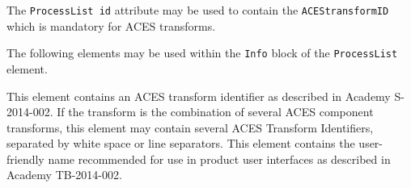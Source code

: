 \label{appendixB}

The \texttt{ProcessList id} attribute may be used to contain the \texttt{ACEStransformID} which is mandatory for ACES transforms.

The following elements may be used within the \texttt{Info} block of the \texttt{ProcessList} element.

\begin{xmlfields}
     This element contains an ACES transform identifier as described in Academy S-2014-002. If the transform is the combination of several ACES component transforms, this element may contain several ACES Transform Identifiers, separated by white space or line separators.
	 This element contains the user-friendly name recommended for use in product user interfaces as described in Academy TB-2014-002.
\end{xmlfields}